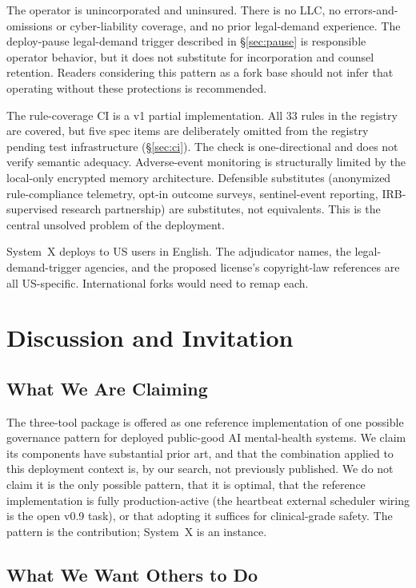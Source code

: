 \documentclass[letterpaper]{article} %
\begin{document}
The operator is unincorporated and uninsured. There is no LLC, no errors-and-omissions or cyber-liability coverage, and no prior legal-demand experience. The deploy-pause legal-demand trigger described in \S\ref{sec:pause} is responsible operator behavior, but it does not substitute for incorporation and counsel retention. Readers considering this pattern as a fork base should not infer that operating without these protections is recommended.

The rule-coverage CI is a v1 partial implementation. All 33 rules in the registry are covered, but five spec items are deliberately omitted from the registry pending test infrastructure (\S\ref{sec:ci}). The check is one-directional and does not verify semantic adequacy. Adverse-event monitoring is structurally limited by the local-only encrypted memory architecture. Defensible substitutes (anonymized rule-compliance telemetry, opt-in outcome surveys, sentinel-event reporting, IRB-supervised research partnership) are substitutes, not equivalents. This is the central unsolved problem of the deployment.

System~X deploys to US users in English. The adjudicator names, the legal-demand-trigger agencies, and the proposed license's copyright-law references are all US-specific. International forks would need to remap each.

\section{Discussion and Invitation}
\label{sec:discussion}

\subsection{What We Are Claiming}

The three-tool package is offered as one reference implementation of one possible governance pattern for deployed public-good AI mental-health systems. We claim its components have substantial prior art, and that the combination applied to this deployment context is, by our search, not previously published. We do not claim it is the only possible pattern, that it is optimal, that the reference implementation is fully production-active (the heartbeat external scheduler wiring is the open v0.9 task), or that adopting it suffices for clinical-grade safety. The pattern is the contribution; System~X is an instance.

\subsection{What We Want Others to Do}
\end{document}
